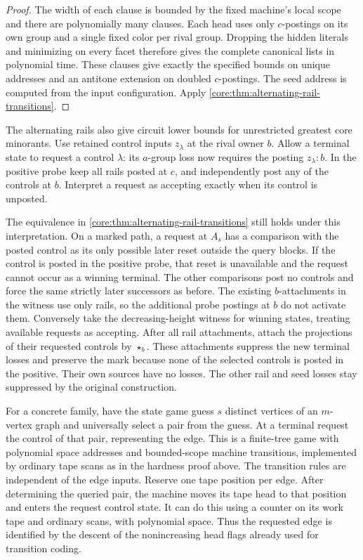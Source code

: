 \begin{proof}
The width of each clause is bounded by the fixed machine's local
scope and there are polynomially many clauses. Each head uses only
$c$-postings on its own group and a single fixed color per rival
group. Dropping the hidden literals and minimizing on every facet
therefore gives the complete canonical lists in polynomial time.
These clauses give exactly the specified bounds on unique addresses
and an antitone extension on doubled $c$-postings. The seed address
is computed from the input configuration. Apply
\cref{core:thm:alternating-rail-transitions}.
\end{proof}

The alternating rails also give circuit lower bounds
for unrestricted greatest core minorants. Use retained
control inputs $z_\lambda$ at the rival owner $b$.
Allow a terminal state to request a control $\lambda$:
its $a$-group loss now requires the posting
$z_\lambda:b$. In the positive probe keep all rails
posted at $c$, and independently post any of the
controls at $b$. Interpret a request as accepting
exactly when its control is unposted.

The equivalence in \cref{core:thm:alternating-rail-transitions}
still holds under this interpretation. On a marked path,
a request at $A_s$ has a comparison with the posted
control as its only possible later reset outside the
query blocks. If the control is posted in the positive
probe, that reset is unavailable and the request
cannot occur as a winning terminal. The other
comparisons post no controls and force the same
strictly later successors as before. The existing
$b$-attachments in the witness use only rails,
so the additional probe postings at $b$ do not
activate them. Conversely
take the decreasing-height witness for winning
states, treating available requests as accepting.
After all rail attachments, attach the projections
of their requested controls by $\star_b$. These
attachments suppress the new terminal losses and
preserve the mark because none of the selected
controls is posted in the positive. Their own
sources have no losses. The other rail and seed
losses stay suppressed by the original construction.

For a concrete family, have the state game guess
$s$ distinct vertices of an $m$-vertex graph and
universally select a pair from the guess. At a
terminal request the control of that pair, representing
the edge. This is a finite-tree game with polynomial
space addresses and bounded-scope machine transitions,
implemented by ordinary tape scans as in the hardness
proof above. The transition rules are independent of
the edge inputs. Reserve one tape position per edge.
After determining the queried pair, the machine
moves its tape head to that position and enters
the request control state. It can do this using
a counter on its work tape and ordinary scans,
with polynomial space. Thus the requested edge
is identified by the descent of the nonincreasing
head flags already used for transition coding.

